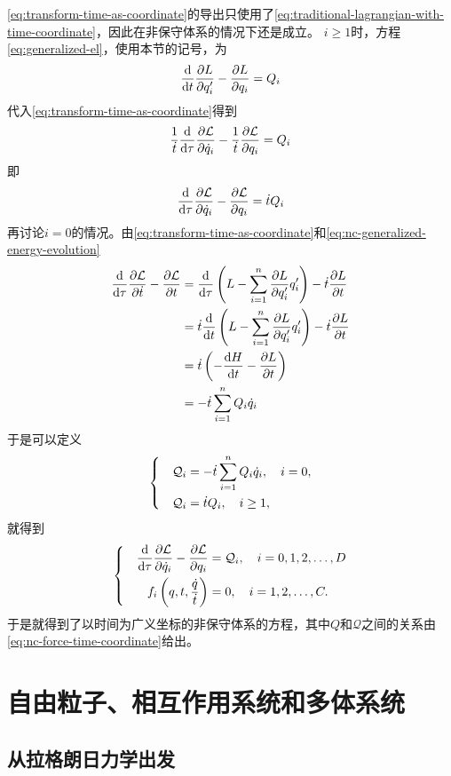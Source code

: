 \documentclass[UTF8, a4paper]{ctexart}
\newenvironment{bigcase}{\left\{\quad\begin{aligned}}{\end{aligned}\right.}
\begin{document}
\eqref{eq:transform-time-as-coordinate}的导出只使用了\eqref{eq:traditional-lagrangian-with-time-coordinate}，因此在非保守体系的情况下还是成立。
$i \geq 1$时，方程\eqref{eq:generalized-el}，使用本节的记号，为
\[
    \dv{t} \pdv{L}{q_i'} - \pdv{L}{q_i} = Q_i
\]
代入\eqref{eq:transform-time-as-coordinate}得到
\[
    \frac{1}{\dot{t}} \dv{\tau} \pdv{\mathcal{L}}{\dot{q}_i} - \frac{1}{\dot{t}} \pdv{\mathcal{L}}{q_i} = Q_i
\]
即
\[
    \dv{\tau} \pdv{\mathcal{L}}{\dot{q}_i} - \pdv{\mathcal{L}}{q_i} = \dot{t} Q_i
\]
再讨论$i=0$的情况。由\eqref{eq:transform-time-as-coordinate}和\eqref{eq:nc-generalized-energy-evolution}
\[
    \begin{aligned}
        \dv{\tau} \pdv{\mathcal{L}}{\dot{t}} - \pdv{\mathcal{L}}{t} &= \dv{\tau} \left( L - \sum_{i=1}^n \pdv{L}{q_i'} q_i' \right) - \dot{t} \pdv{L}{t} \\
        &= \dot{t} \dv{t} \left( L - \sum_{i=1}^n \pdv{L}{q_i'} q_i' \right) - \dot{t} \pdv{L}{t} \\
        &= \dot{t} \left( - \dv{H}{t} - \pdv{L}{t} \right) \\
        &= - \dot{t} \sum_{i=1}^n Q_i \dot{q}_i
    \end{aligned}
\]
于是可以定义
\begin{equation}
    \begin{bigcase}
        \mathcal{Q}_i &= - \dot{t} \sum_{i=1}^n Q_i \dot{q}_i, \quad i = 0, \\
        \mathcal{Q}_i &= \dot{t} Q_i, \quad i \geq 1,
    \end{bigcase}
    \label{eq:nc-force-time-coordinate}
\end{equation}
就得到
\begin{equation}
    \begin{bigcase}
        \dv{\tau} \pdv{\mathcal{L}}{\dot{q}_i} - \pdv{\mathcal{L}}{q_i} &= \mathcal{Q}_i, \quad i = 0, 1, 2, \ldots, D \\
        f_i \left(q, t, \frac{\dot{q}}{\dot{t}}\right) &=0, \quad i = 1, 2, \ldots, C.
    \end{bigcase}
\end{equation}
于是就得到了以时间为广义坐标的非保守体系的方程，其中$Q$和$\mathcal{Q}$之间的关系由\eqref{eq:nc-force-time-coordinate}给出。

\section{自由粒子、相互作用系统和多体系统}

\subsection{从拉格朗日力学出发}
\end{document}
